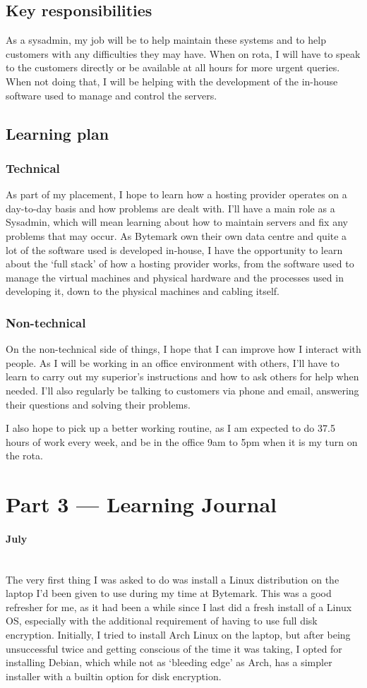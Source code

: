 \documentclass[12pt,a4paper]{article}
\newcommand{\paragraphnl}[1]{\paragraph{#1}\mbox{}\\}
\begin{document}
\subsection*{Key responsibilities}
	As a sysadmin, my job will be to help maintain these systems and to help
	customers with any difficulties they may have. When on rota, I will have to
	speak to the customers directly or be available at all hours for more
	urgent queries. When not doing that, I will be helping with the development
	of the in-house software used to manage and control the servers.

\subsection*{Learning plan}
\subsubsection*{Technical}
	As part of my placement, I hope to learn how a hosting provider operates on
	a day-to-day basis and how problems are dealt with. I'll have a main role
	as a Sysadmin, which will mean learning about how to maintain servers and
	fix any problems that may occur.
	As Bytemark own their own data centre and quite a lot of the software used
	is developed in-house, I have the opportunity to learn about the
	`full stack' of how a hosting provider works, from the software used to
	manage the virtual machines and physical hardware and the processes used in
	developing it, down to the physical machines and cabling itself.

\subsubsection*{Non-technical}
	On the non-technical side of things, I hope that I can improve how I
	interact with people. As I will be working in an office environment with
	others, I'll have to learn to carry out my superior's instructions and how
	to ask others for help when needed. I'll also regularly be talking to
	customers via phone and email, answering their questions and solving their
	problems.

	I also hope to pick up a better working routine, as I am expected to do
	37.5 hours of work every week, and be in the office 9am to 5pm when it is
	my turn on the rota.

\section*{Part 3 --- Learning Journal}
\paragraphnl{July}
	The very first thing I was asked to do was install a Linux distribution on
	the laptop I'd been given to use during my time at Bytemark. This was a
	good refresher for me, as it had been a while since I last did a fresh
	install of a Linux OS, especially with the additional requirement of having
	to use full disk encryption. Initially, I tried to install Arch Linux on
	the laptop, but after being unsuccessful twice and getting conscious of the
	time it was taking, I opted for installing Debian, which while not as
	`bleeding edge' as Arch, has a simpler installer with a builtin option for
	disk encryption.
\end{document}
